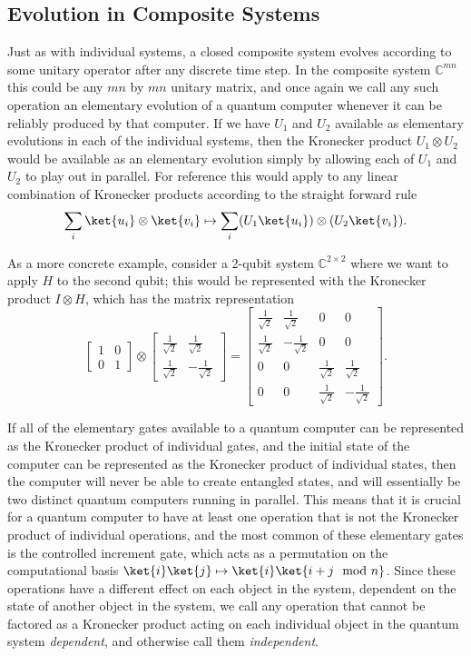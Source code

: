 \subsection{Evolution in Composite Systems}
Just as with individual systems, a closed composite system evolves according to some unitary operator after any discrete time step. In the composite system $\mathbb{C}^{mn}$ this could be any $mn$ by $mn$ unitary matrix, and once again we call any such operation an elementary evolution of a quantum computer whenever it can be reliably produced by that computer. If we have $U_1$ and $U_2$ available as elementary evolutions in each of the individual systems, then the Kronecker product $U_1 \otimes U_2$ would be available as an elementary evolution simply by allowing each of $U_1$ and $U_2$ to play out in parallel. For reference this would apply to any linear combination of Kronecker products according to the straight forward rule
\[\sum_i \ket{u_i}\otimes\ket{v_i} \mapsto \sum_i (U_1\ket{u_i})\otimes (U_2\ket{v_i}).\]

As a more concrete example, consider a 2-qubit system $\mathbb{C}^{2\times 2}$ where we want to apply $H$ to the second qubit; this would be represented with the Kronecker product $I \otimes H$, which has the matrix representation
\[
\left[\begin{matrix}
	1&0\\
	0&1
\end{matrix}\right]
\otimes
\left[\begin{matrix}
	\frac{1}{\sqrt{2}}&\frac{1}{\sqrt{2}}\\
	\frac{1}{\sqrt{2}}&-\frac{1}{\sqrt{2}}
\end{matrix}\right]
=
\left[\begin{matrix}
	\frac{1}{\sqrt{2}}&\frac{1}{\sqrt{2}}&0&0\\
	\frac{1}{\sqrt{2}}&-\frac{1}{\sqrt{2}}&0&0\\
	0&0&\frac{1}{\sqrt{2}}&\frac{1}{\sqrt{2}}\\
	0&0&\frac{1}{\sqrt{2}}&-\frac{1}{\sqrt{2}}
\end{matrix}\right].
\]

If all of the elementary gates available to a quantum computer can be represented as the Kronecker product of individual gates, and the initial state of the computer can be represented as the Kronecker product of individual states, then the computer will never be able to create entangled states, and will essentially be two distinct quantum computers running in parallel. This means that it is crucial for a quantum computer to have at least one operation that is not the Kronecker product of individual operations, and the most common of these elementary gates is the controlled increment gate, which acts as a permutation on the computational basis $\ket{i}\ket{j} \mapsto \ket{i}\ket{i+j \mod n}$. Since these operations have a different effect on each object in the system, dependent on the state of another object in the system, we call any operation that cannot be factored as a Kronecker product acting on each individual object in the quantum system \emph{dependent}, and otherwise call them \emph{independent}.

